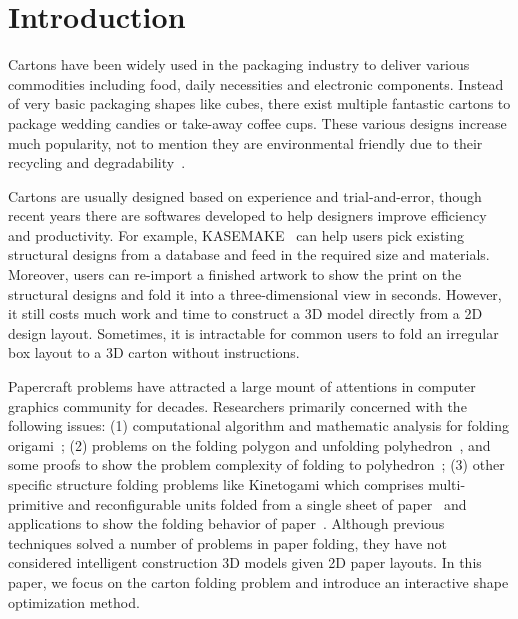 \section{Introduction}

Cartons have been widely used in the packaging industry to deliver various commodities including food, daily necessities and electronic components. Instead of very basic packaging shapes like cubes, there exist multiple fantastic cartons to package wedding candies or take-away coffee cups. 
These various designs increase much popularity, not to mention they are environmental friendly due to their recycling and degradability~\cite{Mullineux:2010:CSC:1739328.1739673}.

Cartons are usually designed based on experience and trial-and-error, though recent years there are softwares developed to help designers improve efficiency and productivity.
For example, KASEMAKE~\cite{KASEMAKE} can help users pick existing structural designs from a database and feed in the required size and materials.
Moreover, users can re-import a finished artwork to show the print on the structural designs and fold it into a three-dimensional view in seconds. 
However, it still costs much work and time to construct a 3D model directly from a 2D design layout.
Sometimes, it is intractable for common users to fold an irregular box layout to a 3D carton without instructions.

Papercraft problems have attracted a large mount of attentions in computer graphics community for decades.
Researchers primarily concerned with the following issues: (1) computational algorithm and mathematic analysis for folding origami~\cite{Ida:2007:MOC:1802954.1803021,Lang:1996:CAO:237218.237249,xl-idetc-14}; (2) problems on the folding polygon and unfolding polyhedron~\cite{Bern:2003:UPC:636968.636970,O'Rourke:1998:FUC:646319.686376,Rourke2008Unfolding}, and some proofs to show the problem complexity of folding to polyhedron~\cite{Biedl:2005:NFP:1090462.1646553,Biedl2004When,Lubiw1996When}; (3) other specific structure folding problems like Kinetogami which comprises multi-primitive and reconfigurable units folded from a single sheet of paper~\cite{Gao2013Kinetogami} and applications to show the folding behavior of paper~\cite{Thiel1998,Kishi:1998:OFP:786112.786279,Nimnual2007Virtual,Shimanuki2009Construction}. 
%
Although previous techniques solved a number of problems in paper folding, they have not considered intelligent construction 3D models given 2D paper layouts. 
In this paper, we focus on the carton folding problem and introduce an interactive shape optimization method.
 
